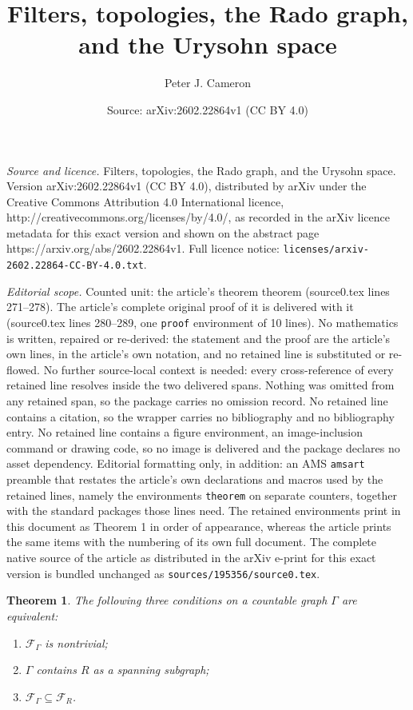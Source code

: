 \documentclass[10pt,a4paper]{amsart}
\title{Filters, topologies, the Rado graph, and the Urysohn space}
\author{Peter J. Cameron}
\date{Source: arXiv:2602.22864v1 (CC BY 4.0)}
\newtheorem{theorem}{Theorem}
\begin{document}
\maketitle

\noindent\emph{Source and licence.} Filters, topologies, the Rado graph, and the Urysohn space. Version arXiv:2602.22864v1 (CC BY 4.0), distributed by arXiv under the Creative Commons Attribution 4.0 International licence, http://creativecommons.org/licenses/by/4.0/, as recorded in the arXiv licence metadata for this exact version and shown on the abstract page https://arxiv.org/abs/2602.22864v1. Full licence notice: \texttt{licenses/arxiv-2602.22864-CC-BY-4.0.txt}.\par\smallskip

\noindent\textit{Editorial scope.} Counted unit: the article's theorem theorem (source0.tex lines 271--278). The article's complete original proof of it is delivered with it (source0.tex lines 280--289, one \texttt{proof} environment of 10 lines). No mathematics is written, repaired or re-derived: the statement and the proof are the article's own lines, in the article's own notation, and no retained line is substituted or re-flowed.  No further source-local context is needed: every cross-reference of every retained line resolves inside the two delivered spans.  Nothing was omitted from any retained span, so the package carries no omission record.  No retained line contains a citation, so the wrapper carries no bibliography and no bibliography entry.  No retained line contains a figure environment, an image-inclusion command or drawing code, so no image is delivered and the package declares no asset dependency.  Editorial formatting only, in addition: an AMS \texttt{amsart} preamble that restates the article's own declarations and macros used by the retained lines, namely the environments \texttt{theorem} on separate counters, together with the standard packages those lines need.  The retained environments print in this document as Theorem 1 in order of appearance, whereas the article prints the same items with the numbering of its own full document.  The complete native source of the article as distributed in the arXiv e-print for this exact version is bundled unchanged as \texttt{sources/195356/source0.tex}.
\begin{theorem}
The following three conditions on a countable graph $\Gamma$ are equivalent:
\begin{enumerate}
\item $\mathcal{F}_\Gamma$ is nontrivial;
\item $\Gamma$ contains $R$ as a spanning subgraph;
\item $\mathcal{F}_\Gamma\subseteq\mathcal{F}_R$.
\end{enumerate}
\end{theorem}
\end{document}
